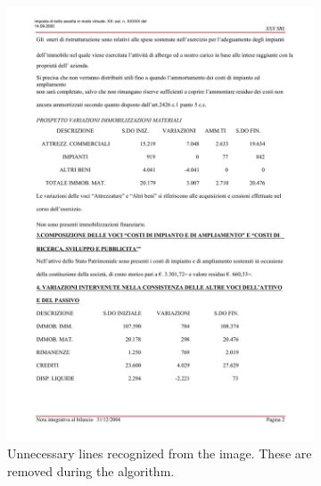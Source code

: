 \begin{figure}[p]
\begin{subfigure}{0.45\textwidth}
\includegraphics[width=\linewidth]{img/implementation/implem2.png}
\caption{Unnecessary lines recognized from the image. These are removed during the algorithm.}
\label{fig:implem2}
\end{subfigure}
\begin{subfigure}{0.45\textwidth}

\end{subfigure}
\end{figure}
